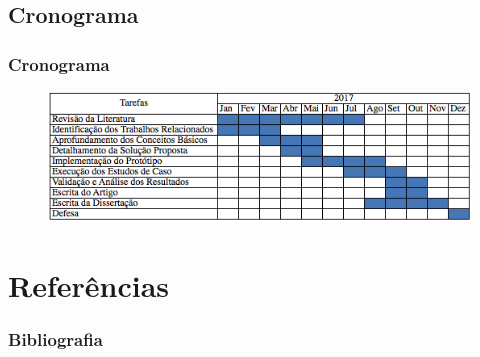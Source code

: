 \documentclass[hyperref={pdfpagelabels=false}]{beamer}
\begin{document}
\subsection{Cronograma}
\begin{frame}
	\frametitle{Cronograma}
		    \begin{figure}
 		   		\centering
	        	\includegraphics[scale=.6]{img/CronogramaDissertacao.png}
   			\end{figure}
 
\end{frame}


\section {Referências}
\begin{frame}[allowframebreaks]
\frametitle{Bibliografia}
    
    \footnotesize{  }
\end{frame}
\end{document}
